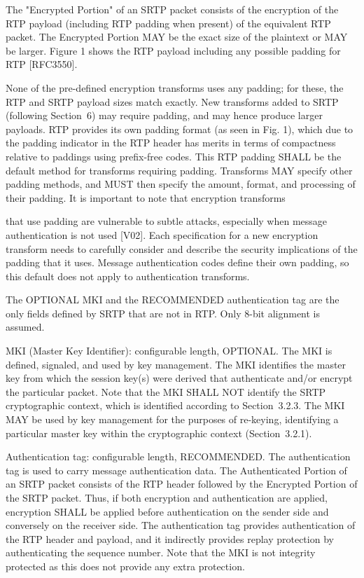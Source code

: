 \documentclass{article}
\begin{document}
The "Encrypted Portion" of an SRTP packet consists of the encryption of the RTP payload (including RTP padding when present) of the equivalent RTP packet.  The Encrypted Portion MAY be the exact size of the plaintext or MAY be larger.  Figure 1 shows the RTP payload including any possible padding for RTP [RFC3550].

None of the pre-defined encryption transforms uses any padding; for these, the RTP and SRTP payload sizes match exactly.  New transforms added to SRTP (following Section~6) may require padding, and may hence produce larger payloads.  RTP provides its own padding format (as seen in Fig. 1), which due to the padding indicator in the RTP header has merits in terms of compactness relative to paddings using prefix-free codes.  This RTP padding SHALL be the default method for transforms requiring padding.  Transforms MAY specify other padding methods, and MUST then specify the amount, format, and processing of their padding.  It is important to note that encryption transforms

that use padding are vulnerable to subtle attacks, especially when message authentication is not used [V02].  Each specification for a new encryption transform needs to carefully consider and describe the security implications of the padding that it uses.  Message authentication codes define their own padding, so this default does not apply to authentication transforms.

The OPTIONAL MKI and the RECOMMENDED authentication tag are the only fields defined by SRTP that are not in RTP.  Only 8-bit alignment is assumed.

MKI (Master Key Identifier): configurable length, OPTIONAL.  The MKI is defined, signaled, and used by key management.  The MKI identifies the master key from which the session key(s) were derived that authenticate and/or encrypt the particular packet.  Note that the MKI SHALL NOT identify the SRTP cryptographic context, which is identified according to Section~3.2.3.  The MKI MAY be used by key management for the purposes of re-keying, identifying a particular master key within the cryptographic context (Section~3.2.1).

Authentication tag: configurable length, RECOMMENDED.  The authentication tag is used to carry message authentication data.  The Authenticated Portion of an SRTP packet consists of the RTP header followed by the Encrypted Portion of the SRTP packet.  Thus, if both encryption and authentication are applied, encryption SHALL be applied before authentication on the sender side and conversely on the receiver side.  The authentication tag provides authentication of the RTP header and payload, and it indirectly provides replay protection by authenticating the sequence number.  Note that the MKI is not integrity protected as this does not provide any extra protection.
\end{document}
